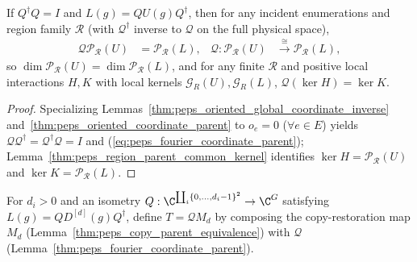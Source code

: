 \begin{lemma}%
    \label{thm:peps_fourier_coordinate_parent}
    \leanok
    If $Q^\dagger Q=I$ and $L(g)=QU(g)Q^\dagger$, then for any incident enumerations and region family $\mathcal R$ (with $\mathcal Q^\dagger$ inverse to $\mathcal Q$ on the full physical space),
    \begin{align}
        \mathcal Q\mathcal P_{\mathcal R}(U) & =\mathcal P_{\mathcal R}(L),
                                             & \mathcal Q:\mathcal P_{\mathcal R}(U) & \xrightarrow{\ \cong\ }
        \mathcal P_{\mathcal R}(L),
        \label{eq:peps_fourier_coordinate_parent}
    \end{align}
    so $\dim\mathcal P_{\mathcal R}(U)=\dim\mathcal P_{\mathcal R}(L)$, and for any finite $\mathcal R$ and positive local interactions $H,K$ with local kernels $\mathcal G_R(U),\mathcal G_R(L)$, $\mathcal Q(\ker H)=\ker K$.
\end{lemma}
\begin{proof}\leanok
    Specializing Lemmas~\ref{thm:peps_oriented_global_coordinate_inverse} and~\ref{thm:peps_oriented_coordinate_parent} to $o_e=0$ ($\forall e\in E$) yields $\mathcal Q\mathcal Q^\dagger=\mathcal Q^\dagger\mathcal Q=I$ and (\ref{eq:peps_fourier_coordinate_parent}); Lemma~\ref{thm:peps_region_parent_common_kernel} identifies $\ker H=\mathcal P_{\mathcal R}(U)$ and $\ker K=\mathcal P_{\mathcal R}(L)$.
\end{proof}

\begin{definition}%
    \label{def:peps_fourier_semiregular_parent_map}
    \leanok
    For $d_i>0$ and an isometry $Q:\C^{\coprod_i\{0,\ldots,d_i-1\}^2}\to\C^G$ satisfying $L(g)=QD^{[d]}(g)Q^\dagger$, define $T=\mathcal Q M_d$ by composing the copy-restoration map $M_d$ (Lemma~\ref{thm:peps_copy_parent_equivalence}) with $\mathcal Q$ (Lemma~\ref{thm:peps_fourier_coordinate_parent}).
\end{definition}

